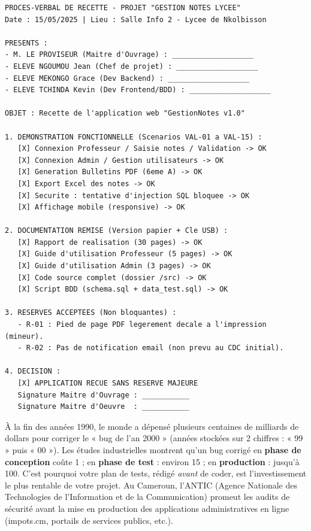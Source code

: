 \documentclass[11pt]{article}
\begin{document}
\begin{exemplebox}
\begin{lstlisting}
PROCES-VERBAL DE RECETTE - PROJET "GESTION NOTES LYCEE"
Date : 15/05/2025 | Lieu : Salle Info 2 - Lycee de Nkolbisson

PRESENTS :
- M. LE PROVISEUR (Maitre d'Ouvrage) : ___________________
- ELEVE NGOUMOU Jean (Chef de projet) : ___________________
- ELEVE MEKONGO Grace (Dev Backend) : ___________________
- ELEVE TCHINDA Kevin (Dev Frontend/BDD) : ___________________

OBJET : Recette de l'application web "GestionNotes v1.0"

1. DEMONSTRATION FONCTIONNELLE (Scenarios VAL-01 a VAL-15) :
   [X] Connexion Professeur / Saisie notes / Validation -> OK
   [X] Connexion Admin / Gestion utilisateurs -> OK
   [X] Generation Bulletins PDF (6eme A) -> OK
   [X] Export Excel des notes -> OK
   [X] Securite : tentative d'injection SQL bloquee -> OK
   [X] Affichage mobile (responsive) -> OK

2. DOCUMENTATION REMISE (Version papier + Cle USB) :
   [X] Rapport de realisation (30 pages) -> OK
   [X] Guide d'utilisation Professeur (5 pages) -> OK
   [X] Guide d'utilisation Admin (3 pages) -> OK
   [X] Code source complet (dossier /src) -> OK
   [X] Script BDD (schema.sql + data_test.sql) -> OK

3. RESERVES ACCEPTEES (Non bloquantes) :
   - R-01 : Pied de page PDF legerement decale a l'impression (mineur).
   - R-02 : Pas de notification email (non prevu au CDC initial).

4. DECISION :
   [X] APPLICATION RECUE SANS RESERVE MAJEURE
   Signature Maitre d'Ouvrage : ___________
   Signature Maitre d'Oeuvre  : ___________
\end{lstlisting}
\end{exemplebox}

\begin{savaistu}
À la fin des années 1990, le monde a dépensé plusieurs centaines de milliards de dollars pour corriger le « bug de l'an 2000 » (années stockées sur 2 chiffres : « 99 » puis « 00 »). Les études industrielles montrent qu'un bug corrigé en \textbf{phase de conception} coûte 1 ; en \textbf{phase de test} : environ 15 ; en \textbf{production} : jusqu'à 100. C'est pourquoi votre plan de tests, rédigé \emph{avant} de coder, est l'investissement le plus rentable de votre projet. Au Cameroun, l'ANTIC (Agence Nationale des Technologies de l'Information et de la Communication) promeut les audits de sécurité avant la mise en production des applications administratives en ligne (impots.cm, portails de services publics, etc.).
\end{savaistu}
\end{document}
